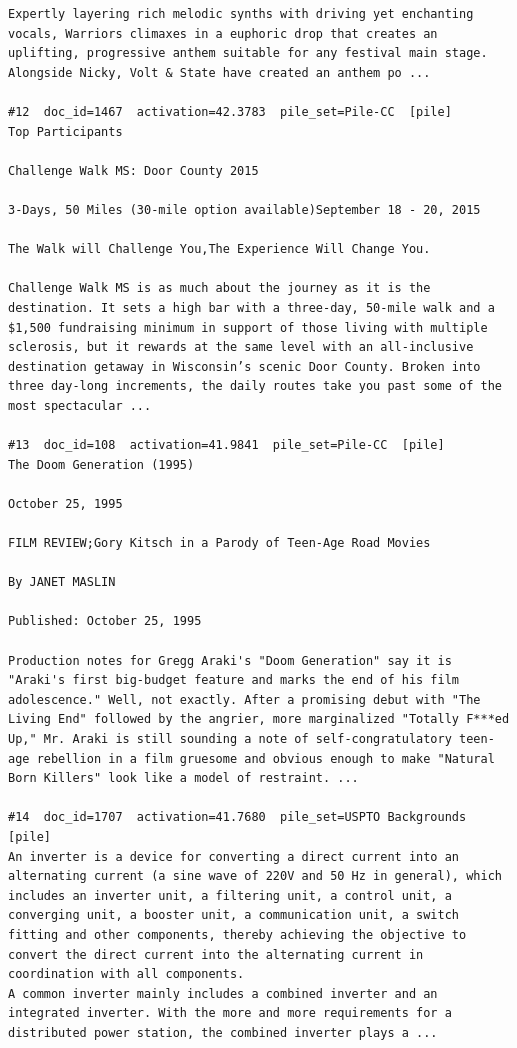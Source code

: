 \begin{verbatim}
Expertly layering rich melodic synths with driving yet enchanting vocals, Warriors climaxes in a euphoric drop that creates an uplifting, progressive anthem suitable for any festival main stage. Alongside Nicky, Volt & State have created an anthem po ...

#12  doc_id=1467  activation=42.3783  pile_set=Pile-CC  [pile]
Top Participants

Challenge Walk MS: Door County 2015

3-Days, 50 Miles (30-mile option available)September 18 - 20, 2015

The Walk will Challenge You,The Experience Will Change You.

Challenge Walk MS is as much about the journey as it is the destination. It sets a high bar with a three-day, 50-mile walk and a $1,500 fundraising minimum in support of those living with multiple sclerosis, but it rewards at the same level with an all-inclusive destination getaway in Wisconsin’s scenic Door County. Broken into three day-long increments, the daily routes take you past some of the most spectacular ...

#13  doc_id=108  activation=41.9841  pile_set=Pile-CC  [pile]
The Doom Generation (1995)

October 25, 1995

FILM REVIEW;Gory Kitsch in a Parody of Teen-Age Road Movies

By JANET MASLIN

Published: October 25, 1995

Production notes for Gregg Araki's "Doom Generation" say it is "Araki's first big-budget feature and marks the end of his film adolescence." Well, not exactly. After a promising debut with "The Living End" followed by the angrier, more marginalized "Totally F***ed Up," Mr. Araki is still sounding a note of self-congratulatory teen-age rebellion in a film gruesome and obvious enough to make "Natural Born Killers" look like a model of restraint. ...

#14  doc_id=1707  activation=41.7680  pile_set=USPTO Backgrounds  [pile]
An inverter is a device for converting a direct current into an alternating current (a sine wave of 220V and 50 Hz in general), which includes an inverter unit, a filtering unit, a control unit, a converging unit, a booster unit, a communication unit, a switch fitting and other components, thereby achieving the objective to convert the direct current into the alternating current in coordination with all components.
A common inverter mainly includes a combined inverter and an integrated inverter. With the more and more requirements for a distributed power station, the combined inverter plays a ...


\end{verbatim}
